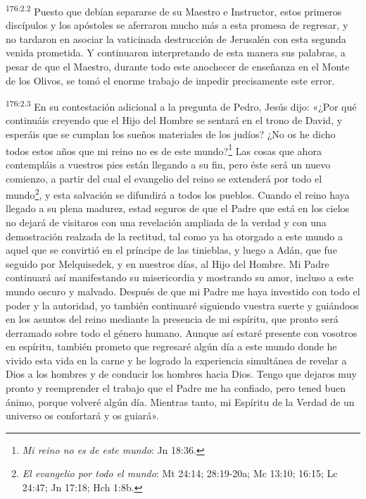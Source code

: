 \par
\textsuperscript{176:2.2} Puesto que debían separarse de su Maestro e Instructor, estos primeros discípulos y los apóstoles se aferraron mucho más a esta promesa de regresar, y no tardaron en asociar la vaticinada destrucción de Jerusalén con esta segunda venida prometida. Y continuaron interpretando de esta manera sus palabras, a pesar de que el Maestro, durante todo este anochecer de enseñanza en el Monte de los Olivos, se tomó el enorme trabajo de impedir precisamente este error.

\par
\textsuperscript{176:2.3} En su contestación adicional a la pregunta de Pedro, Jesús dijo: «¿Por qué continuáis creyendo que el Hijo del Hombre se sentará en el trono de David, y esperáis que se cumplan los sueños materiales de los judíos? ¿No os he dicho todos estos años que mi reino no es de este mundo?\footnote{\textit{Mi reino no es de este mundo}: Jn 18:36.} Las cosas que ahora contempláis a vuestros pies están llegando a su fin, pero éste será un nuevo comienzo, a partir del cual el evangelio del reino se extenderá por todo el mundo\footnote{\textit{El evangelio por todo el mundo}: Mt 24:14; 28:19-20a; Mc 13:10; 16:15; Lc 24:47; Jn 17:18; Hch 1:8b.}, y esta salvación se difundirá a todos los pueblos. Cuando el reino haya llegado a su plena madurez, estad seguros de que el Padre que está en los cielos no dejará de visitaros con una revelación ampliada de la verdad y con una demostración realzada de la rectitud, tal como ya ha otorgado a este mundo a aquel que se convirtió en el príncipe de las tinieblas, y luego a Adán, que fue seguido por Melquisedek, y en nuestros días, al Hijo del Hombre. Mi Padre continuará así manifestando su misericordia y mostrando su amor, incluso a este mundo oscuro y malvado. Después de que mi Padre me haya investido con todo el poder y la autoridad, yo también continuaré siguiendo vuestra suerte y guiándoos en los asuntos del reino mediante la presencia de mi espíritu, que pronto será derramado sobre todo el género humano. Aunque así estaré presente con vosotros en espíritu, también prometo que regresaré algún día a este mundo donde he vivido esta vida en la carne y he logrado la experiencia simultánea de revelar a Dios a los hombres y de conducir los hombres hacia Dios. Tengo que dejaros muy pronto y reemprender el trabajo que el Padre me ha confiado, pero tened buen ánimo, porque volveré algún día. Mientras tanto, mi Espíritu de la Verdad de un universo os confortará y os guiará».

